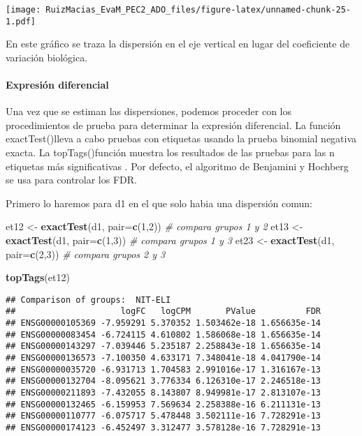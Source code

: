 \documentclass[
]{article}
\newenvironment{Shaded}{\begin{snugshade}}{\end{snugshade}}
\newcommand{\CommentTok}[1]{\textcolor[rgb]{0.56,0.35,0.01}{\textit{#1}}}
\newcommand{\DataTypeTok}[1]{\textcolor[rgb]{0.13,0.29,0.53}{#1}}
\newcommand{\DecValTok}[1]{\textcolor[rgb]{0.00,0.00,0.81}{#1}}
\newcommand{\KeywordTok}[1]{\textcolor[rgb]{0.13,0.29,0.53}{\textbf{#1}}}
\newcommand{\NormalTok}[1]{#1}
\newcommand{\StringTok}[1]{\textcolor[rgb]{0.31,0.60,0.02}{#1}}
\begin{document}
\texttt{[image: RuizMacias\_EvaM\_PEC2\_ADO\_files/figure-latex/unnamed-chunk-25-1.pdf]}

En este gráfico se traza la dispersión en el eje vertical en lugar del
coeficiente de variación biológica.

\hypertarget{expresiuxf3n-diferencial-1}{%
\paragraph{Expresión diferencial}\label{expresiuxf3n-diferencial-1}}

Una vez que se estiman las dispersiones, podemos proceder con los
procedimientos de prueba para determinar la expresión diferencial. La
función exactTest()lleva a cabo pruebas con etiquetas usando la prueba
binomial negativa exacta. La topTags()función muestra los resultados de
las pruebas para las n etiquetas más significativas . Por defecto, el
algoritmo de Benjamini y Hochberg se usa para controlar los FDR.

Primero lo haremos para d1 en el que solo habia una dispersión comun:

\begin{Shaded}
\begin{Highlighting}[]
\NormalTok{et12 <-}\StringTok{ }\KeywordTok{exactTest}\NormalTok{(d1, }\DataTypeTok{pair=}\KeywordTok{c}\NormalTok{(}\DecValTok{1}\NormalTok{,}\DecValTok{2}\NormalTok{)) }\CommentTok{# compara grupos 1 y 2}
\NormalTok{et13 <-}\StringTok{ }\KeywordTok{exactTest}\NormalTok{(d1, }\DataTypeTok{pair=}\KeywordTok{c}\NormalTok{(}\DecValTok{1}\NormalTok{,}\DecValTok{3}\NormalTok{)) }\CommentTok{# compara grupos 1 y 3}
\NormalTok{et23 <-}\StringTok{ }\KeywordTok{exactTest}\NormalTok{(d1, }\DataTypeTok{pair=}\KeywordTok{c}\NormalTok{(}\DecValTok{2}\NormalTok{,}\DecValTok{3}\NormalTok{)) }\CommentTok{# compara grupos 2 y 3}

\KeywordTok{topTags}\NormalTok{(et12)}
\end{Highlighting}
\end{Shaded}

\begin{verbatim}
## Comparison of groups:  NIT-ELI 
##                     logFC   logCPM       PValue          FDR
## ENSG00000105369 -7.959291 5.370352 1.503462e-18 1.656635e-14
## ENSG00000083454 -6.724115 4.610802 1.586068e-18 1.656635e-14
## ENSG00000143297 -7.039446 5.235187 2.258843e-18 1.656635e-14
## ENSG00000136573 -7.100350 4.633171 7.348041e-18 4.041790e-14
## ENSG00000035720 -6.931713 1.704583 2.991016e-17 1.316167e-13
## ENSG00000132704 -8.095621 3.776334 6.126310e-17 2.246518e-13
## ENSG00000211893 -7.432055 8.143807 8.949981e-17 2.813107e-13
## ENSG00000132465 -6.159953 7.569634 2.258388e-16 6.211131e-13
## ENSG00000110777 -6.075717 5.478448 3.502111e-16 7.728291e-13
## ENSG00000174123 -6.452497 3.312477 3.578128e-16 7.728291e-13
\end{verbatim}
\end{document}
